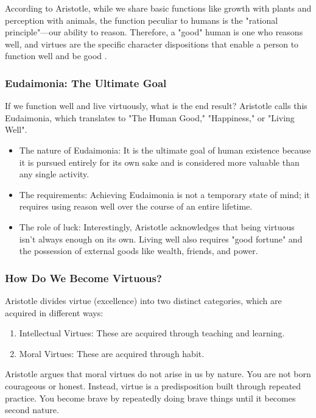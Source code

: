 \documentclass[12pt]{article}
\begin{document}
\smallskip
\noindent According to Aristotle, while we share basic functions like growth with plants and perception with animals, the function peculiar to humans is the "rational principle"—our ability to reason.
Therefore, a "good" human is one who reasons well, and virtues are the specific character dispositions that enable a person to function well and be good .

\subsubsection{Eudaimonia: The Ultimate Goal}
If we function well and live virtuously, what is the end result? Aristotle calls this Eudaimonia, which translates to "The Human Good," "Happiness," or "Living Well".
\begin{itemize}
    \item The nature of Eudaimonia: It is the ultimate goal of human existence because it is pursued entirely for its own sake and is considered more valuable than any single activity.
    \item The requirements: Achieving Eudaimonia is not a temporary state of mind; it requires using reason well over the course of an entire lifetime.
    \item The role of luck: Interestingly, Aristotle acknowledges that being virtuous isn't always enough on its own. Living well also requires "good fortune" and the possession of external goods like wealth, friends, and power.
\end{itemize}

\subsubsection{How Do We Become Virtuous?}
Aristotle divides virtue (excellence) into two distinct categories, which are acquired in different ways:
\begin{enumerate}
    \item Intellectual Virtues: These are acquired through teaching and learning.
    \item Moral Virtues: These are acquired through habit.
\end{enumerate}
Aristotle argues that moral virtues do not arise in us by nature. You are not born courageous or honest. Instead, virtue is a predisposition built through repeated practice. You become brave by repeatedly doing brave things until it becomes second nature.
\end{document}

